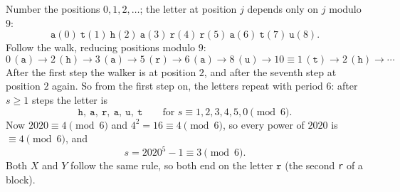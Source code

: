 Number the positions $0,1,2,\dots$; the letter at position $j$ depends only on $j$ modulo $9$:
\[\texttt{a}(0)\ \texttt{t}(1)\ \texttt{h}(2)\ \texttt{a}(3)\ \texttt{r}(4)\ \texttt{r}(5)\ \texttt{a}(6)\ \texttt{t}(7)\ \texttt{u}(8).\]
Follow the walk, reducing positions modulo $9$:
\[0\,(\texttt{a})\to2\,(\texttt{h})\to3\,(\texttt{a})\to5\,(\texttt{r})\to6\,(\texttt{a})\to8\,(\texttt{u})\to10\equiv1\,(\texttt{t})\to2\,(\texttt{h})\to\cdots\]
After the first step the walker is at position $2$, and after the seventh step at position $2$ again. So from the first step on, the letters repeat with period $6$: after $s\ge1$ steps the letter is
\[\texttt{h},\ \texttt{a},\ \texttt{r},\ \texttt{a},\ \texttt{u},\ \texttt{t}\qquad\text{for } s\equiv1,2,3,4,5,0\pmod6 .\]
Now $2020\equiv4\pmod6$ and $4^2=16\equiv4\pmod6$, so every power of $2020$ is $\equiv4\pmod6$, and
\[s=2020^5-1\equiv3\pmod6 .\]
Both $X$ and $Y$ follow the same rule, so both end on the letter $\boxed{\texttt{r}}$ (the second \texttt{r} of a block).
